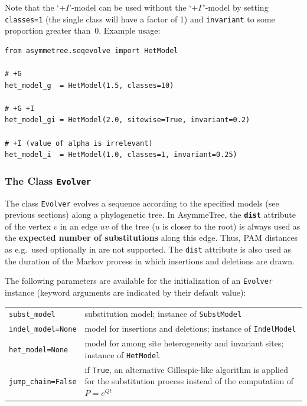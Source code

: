\documentclass[hidelinks,11pt]{article}
\begin{document}
Note that the `$+I$'-model can be used without the `$+\Gamma$'-model by setting \texttt{classes=1} (the single class will have a factor of 1) and \texttt{invariant} to some proportion greater than~0.
Example usage:

\begin{adjustwidth}{1cm}{1cm}\vspace{2mm}
\begin{verbatim}
from asymmetree.seqevolve import HetModel

# +G
het_model_g  = HetModel(1.5, classes=10)

# +G +I
het_model_gi = HetModel(2.0, sitewise=True, invariant=0.2)

# +I (value of alpha is irrelevant)
het_model_i  = HetModel(1.0, classes=1, invariant=0.25)
\end{verbatim}
\end{adjustwidth}


\subsubsection{The Class \texttt{Evolver}}

The class \texttt{Evolver} evolves a sequence according to the specified models (see previous sections) along a phylogenetic tree.
In AsymmeTree, the \textbf{\texttt{dist}} attribute of the vertex $v$ in an edge $uv$ of the tree ($u$ is closer to the root) is always used as the \textbf{expected number of substitutions} along this edge.
Thus, PAM distances as e.g.\ used optionally in \citep{dalquen2012} are not supported.
The \texttt{dist} attribute is also used as the duration of the Markov process in which insertions and deletions are drawn.

The following parameters are available for the initialization of an \texttt{Evolver} instance (keyword arguments are indicated by their default value):

\vspace{3mm}
{\small\centering
	\begin{longtable}{ p{4.5cm} p{9cm} }
		\texttt{subst\_model} & substitution model; instance of \texttt{SubstModel}\\
		\texttt{indel\_model=None} & model for insertions and deletions; instance of \texttt{IndelModel}\\
		\texttt{het\_model=None} & model for among site heterogeneity and invariant sites; instance of \texttt{HetModel}\\
		\texttt{jump\_chain=False} & if \texttt{True}, an alternative Gillespie-like \citep{gillespie1976} algorithm is applied for the substitution process instead of the computation of $P=e^{Qt}$ \\
	\end{longtable}
}
\vspace{3mm}
\end{document}

